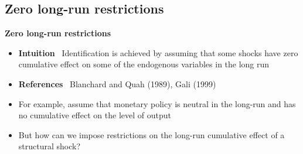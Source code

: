
\subsection{Zero long-run restrictions}

\begin{frame}
\vspace{3cm} \color{title}\bigskip

\color{note}
\end{frame}


\begin{frame}
{\textbf{Zero long-run restrictions}}\bigskip \bigskip

\begin{itemize}
\item \textbf{Intuition} \ Identification is achieved by assuming that some
shocks have zero cumulative effect on some of the endogenous variables in
the long run\bigskip\medskip

\item \textbf{References} \ Blanchard and Quah (1989), Gali (1999)\bigskip
\medskip \pause

\item For example, assume that monetary policy is neutral in the long-run
and has no cumulative effect on the level of output\bigskip\medskip\pause

\item But how can we impose restrictions on the long-run cumulative effect
of a structural shock?
\end{itemize}
\end{frame}


